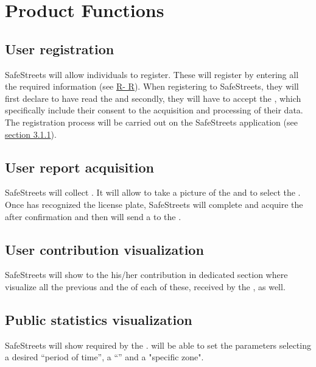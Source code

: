 \documentclass[../../RASD.tex]{subfiles}
\begin{document}
	
	\section{Product Functions}
	
	\subsection{User registration}
	SafeStreets will allow individuals to register. These will register by entering all the required information (see \hyperref[sect:3.2.5]{R- R}). When registering to SafeStreets, they will first declare to have read the  and secondly, they will have to accept the , which specifically include their consent to the acquisition and processing of their data. \\
	The  registration process will be carried out on the SafeStreets application (see \hyperref[sect:3.1.1]{section 3.1.1}). 
	
	\subsection{User report acquisition}
	SafeStreets will collect . It will allow  to take a picture of the  and to select the . Once  has recognized the license plate, SafeStreets will complete and acquire the  after  confirmation and then will send a  to the . 
	
	\subsection{User contribution visualization}
	SafeStreets will show to the  his/her contribution in dedicated section where visualize all the previous  and the  of each of these, received by the , as well.
	
	\subsection{Public statistics visualization}
	SafeStreets will show  required by the .  will be able to set the parameters selecting a desired “period of time”, a “” and a "specific zone". 
	
\end{document}
